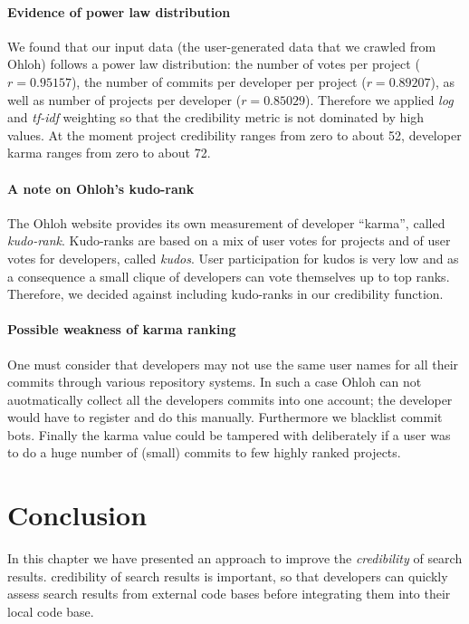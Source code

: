 \documentclass[10pt]{book}
\begin{document}
\paragraph{Evidence of power law distribution} 
We found that our input data (\ie the user-generated data that we crawled from Ohloh) follows a power law distribution: the number of votes per project ($r = 0.95157$), the number of commits per developer per project ($r = 0.89207$), as well as number of projects per developer ($r = 0.85029$). Therefore we applied \emph{log} and \emph{tf-idf} weighting so that the credibility metric is not dominated by high values.
At the moment project credibility ranges from zero to about 52, developer karma ranges from zero to about 72.

\paragraph{A note on Ohloh's kudo-rank}
The Ohloh website provides its own measurement of developer ``karma'', called \emph{kudo-rank}. Kudo-ranks are based on a mix of user votes for projects and of user votes for developers, called \emph{kudos}. User participation for kudos is very low and as a consequence a small clique of developers can vote themselves up to top ranks. Therefore, we decided against including kudo-ranks in our credibility function.

\paragraph{Possible weakness of karma ranking}
One must consider that developers may not use the same user names for all their commits through various repository systems. In such a case Ohloh can not auotmatically collect all the developers commits into one account; the developer would have to register and do this manually. Furthermore we blacklist commit bots. Finally the karma value could be tampered with deliberately if a user was to do a huge number of (small) commits to few highly ranked projects.

\section{Conclusion}
\label{sec:conclusion}

In this chapter we have presented an approach to improve the \emph{credibility} of search results. credibility of search results is important, so that developers can quickly assess search results from external code bases before integrating them into their local code base. 
\end{document}
